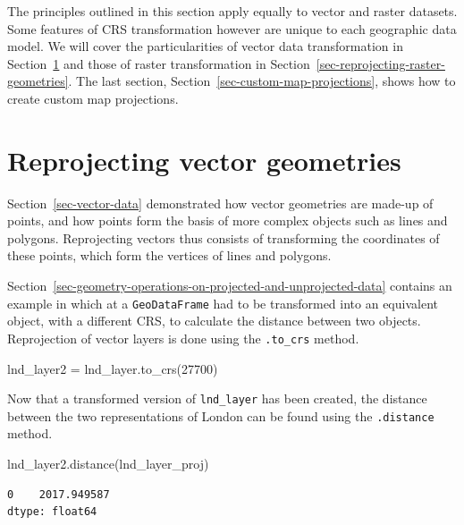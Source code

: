 \documentclass[
  letterpaper,
]{krantz}
\newenvironment{Shaded}{\begin{snugshade}}{\end{snugshade}}
\newcommand{\DecValTok}[1]{\textcolor[rgb]{0.68,0.00,0.00}{#1}}
\newcommand{\NormalTok}[1]{\textcolor[rgb]{0.00,0.23,0.31}{#1}}
\newcommand{\OperatorTok}[1]{\textcolor[rgb]{0.37,0.37,0.37}{#1}}
\begin{document}
The principles outlined in this section apply equally to vector and
raster datasets. Some features of CRS transformation however are unique
to each geographic data model. We will cover the particularities of
vector data transformation in
Section~\ref{sec-reprojecting-vector-geometries} and those of raster
transformation in Section~\ref{sec-reprojecting-raster-geometries}. The
last section, Section~\ref{sec-custom-map-projections}, shows how to
create custom map projections.

\section{Reprojecting vector
geometries}\label{sec-reprojecting-vector-geometries}

Section~\ref{sec-vector-data} demonstrated how vector geometries are
made-up of points, and how points form the basis of more complex objects
such as lines and polygons. Reprojecting vectors thus consists of
transforming the coordinates of these points, which form the vertices of
lines and polygons.

Section~\ref{sec-geometry-operations-on-projected-and-unprojected-data}
contains an example in which at a \texttt{GeoDataFrame} had to be
transformed into an equivalent object, with a different CRS, to
calculate the distance between two objects. Reprojection of vector
layers is done using the \texttt{.to\_crs} method.

\begin{Shaded}
\begin{Highlighting}[]
\NormalTok{lnd\_layer2 }\OperatorTok{=}\NormalTok{ lnd\_layer.to\_crs(}\DecValTok{27700}\NormalTok{)}
\end{Highlighting}
\end{Shaded}

Now that a transformed version of \texttt{lnd\_layer} has been created,
the distance between the two representations of London can be found
using the \texttt{.distance} method.

\begin{Shaded}
\begin{Highlighting}[]
\NormalTok{lnd\_layer2.distance(lnd\_layer\_proj)}
\end{Highlighting}
\end{Shaded}

\begin{verbatim}
0    2017.949587
dtype: float64
\end{verbatim}
\end{document}
